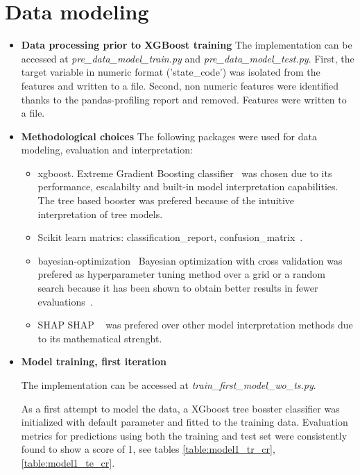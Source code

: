 \documentclass{article}
\begin{document}
{\begin{itemize}
\end{itemize}


\section{Data modeling}
\label{sec:model}
\begin{itemize}
\item \textbf{Data processing prior to XGBoost training}
The implementation can be accessed at \emph{pre\_data\_model\_train.py} and \emph{pre\_data\_model\_test.py}.
First, the target variable in numeric format ('state\_code') was isolated from the features and written to a file.
Second, non numeric features were identified thanks to the pandas-profiling report and removed. Features were written to a file.

\item \textbf{Methodological choices}
The following packages were used for data modeling, evaluation and interpretation:
\begin{itemize}
	\item xgboost.
	Extreme Gradient Boosting classifier~\cite{DBLP:journals/corr/ChenG16} was chosen due to its performance, escalabilty and built-in model interpretation capabilities.
The tree based booster was prefered because of the intuitive interpretation of tree models.
	\item Scikit learn matrics: classification\_report, confusion\_matrix~\cite{pedregosa2011scikit}.
	\item bayesian-optimization~\cite{nogueiraBayOpt}
	Bayesian optimization with cross validation was prefered as hyperparameter tuning method over a grid or a random search because it has been shown to obtain better results in fewer evaluations~\cite{snoek2012practical, NIPS2011_4443}.

	\item SHAP
	SHAP ~\cite{DBLP:journals/corr/LundbergL17, lundberg2020local2global} was prefered over other model interpretation methods due to its mathematical strenght.
\end{itemize}

\item \textbf{Model training, first iteration}

The implementation can be accessed at \emph{train\_first\_model\_wo\_ts.py}.

As a first attempt to model the data, a XGboost tree bosster classifier was initialized with default parameter and fitted to the training data. Evaluation metrics for predictions using both the training and test set were consistently found to show a score of 1, see tables \ref{table:model1_tr_cr}, \ref{table:model1_te_cr}.


\end{itemize}}
\end{document}
